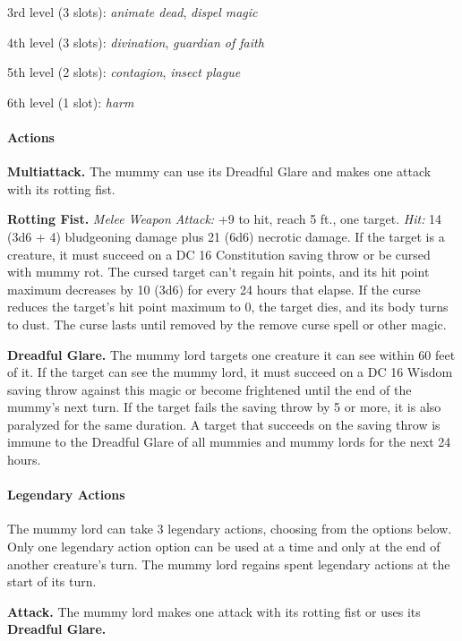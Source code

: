 \documentclass[
]{article}
\begin{document}
3rd level (3 slots): \emph{animate dead}, \emph{dispel magic}

4th level (3 slots): \emph{divination}, \emph{guardian of faith}

5th level (2 slots): \emph{contagion}, \emph{insect plague}

6th level (1 slot): \emph{harm}

\hypertarget{actions-12}{%
\paragraph{Actions}\label{actions-12}}

\textbf{Multiattack.} The mummy can use its Dreadful Glare and makes one
attack with its rotting fist.

\textbf{Rotting Fist.} \emph{Melee Weapon Attack:} +9 to hit, reach 5
ft., one target. \emph{Hit:} 14 (3d6 + 4) bludgeoning damage plus 21
(6d6) necrotic damage. If the target is a creature, it must succeed on a
DC 16 Constitution saving throw or be cursed with mummy rot. The cursed
target can't regain hit points, and its hit point maximum decreases by
10 (3d6) for every 24 hours that elapse. If the curse reduces the
target's hit point maximum to 0, the target dies, and its body turns to
dust. The curse lasts until removed by the remove curse spell or other
magic.

\textbf{Dreadful Glare.} The mummy lord targets one creature it can see
within 60 feet of it. If the target can see the mummy lord, it must
succeed on a DC 16 Wisdom saving throw against this magic or become
frightened until the end of the mummy's next turn. If the target fails
the saving throw by 5 or more, it is also paralyzed for the same
duration. A target that succeeds on the saving throw is immune to the
Dreadful Glare of all mummies and mummy lords for the next 24 hours.

\hypertarget{legendary-actions}{%
\paragraph{Legendary Actions}\label{legendary-actions}}

The mummy lord can take 3 legendary actions, choosing from the options
below. Only one legendary action option can be used at a time and only
at the end of another creature's turn. The mummy lord regains spent
legendary actions at the start of its turn.

\textbf{Attack.} The mummy lord makes one attack with its rotting fist
or uses its \textbf{Dreadful Glare.}
\end{document}
